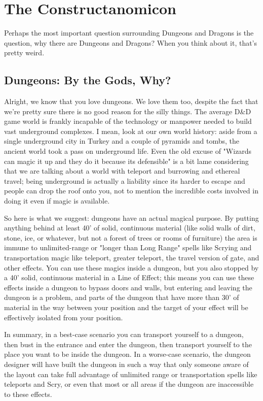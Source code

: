 \section{The Constructanomicon}
\vspace*{-10pt}

Perhaps the most important question surrounding Dungeons and Dragons is the question, why there are Dungeons and Dragons? When you think about it, that's pretty weird.

\subsection{Dungeons: By the Gods, Why?}

Alright, we know that you love dungeons. We love them too, despite the fact that we're pretty sure there is no good reason for the silly things. The average D\&D game world is frankly incapable of the technology or manpower needed to build vast underground complexes. I mean, look at our own world history: aside from a single underground city in Turkey and a couple of pyramids and tombs, the ancient world took a pass on underground life. Even the old excuse of "Wizards can magic it up and they do it because its defensible" is a bit lame considering that we are talking about a world with teleport and burrowing and ethereal travel; being underground is actually a liability since its harder to escape and people can drop the roof onto you, not to mention the incredible costs involved in doing it even if magic is available.

So here is what we suggest: dungeons have an actual magical purpose. By putting anything behind at least 40' of solid, continuous material (like solid walls of dirt, stone, ice, or whatever, but not a forest of trees or rooms of furniture) the area is immune to unlimited-range or "longer than Long Range" spells like Scrying and transportation magic like teleport, greater teleport, the travel version of gate, and other effects. You can use these magics inside a dungeon, but you also stopped by a 40' solid, continuous material in a Line of Effect; this means you can use these effects inside a dungeon to bypass doors and walls, but entering and leaving the dungeon is a problem, and parts of the dungeon that have more than 30' of material in the way between your position and the target of your effect will be effectively isolated from your position.

In summary, in a best-case scenario you can transport yourself to a dungeon, then bust in the entrance and enter the dungeon, then transport yourself to the place you want to be inside the dungeon. In a worse-case scenario, the dungeon designer will have built the dungeon in such a way that only someone aware of the layout can take full advantage of unlimited range or transportation spells like teleports and Scry, or even that most or all areas if the dungeon are inaccessible to these effects.

